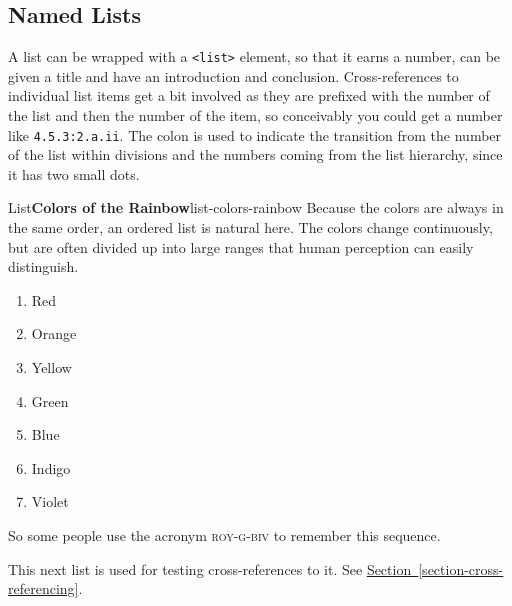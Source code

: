 \documentclass[pdflatex]{sn-jnl}
\theoremstyle{thmstyleone}%
\theoremstyle{thmstyletwo}%
\theoremstyle{thmstylethree}%
\newcommand{\xreffont}{\relax}
\newcommand{\mono}[1]{\texttt{#1}}
\newcommand{\acronym}[1]{\textsc{\MakeLowercase{#1}}}
\numberwithin{equation}{section}
\begin{document}
\subsection{Named Lists}\label{section-lists-8}%
%
%
A list can be wrapped with a \mono{<list>} element, so that it earns a number, can be given a title and have an introduction and conclusion.  Cross-references to individual list items get a bit involved as they are prefixed with the number of the list and then the number of the item, so conceivably you could get a number like \mono{4.5.3:2.a.ii}.  The colon is used to indicate the transition from the number of the list within divisions and the numbers coming from the list hierarchy, since it has two small dots.%
\begin{listptx}{List}{\textbf{Colors of the Rainbow}}{list-colors-rainbow}{}%
Because the colors are always in the same order, an ordered list is natural here.  The colors change continuously, but are often divided up into large ranges that human perception can easily distinguish.%
%
\begin{enumerate}
\item{}Red%
\item\hypertarget{rainbow-orange}{}Orange%
\item{}Yellow%
\item{}Green%
\item{}Blue%
\item{}Indigo%
\item{}Violet%
\end{enumerate}
So some people use the acronym \acronym{ROY-G-BIV} to remember this sequence.%
\end{listptx}%
This next list is used for testing cross-references to it.  See \hyperref[section-cross-referencing]{Section~{\xreffont\ref{section-cross-referencing}}}.%
\end{document}
